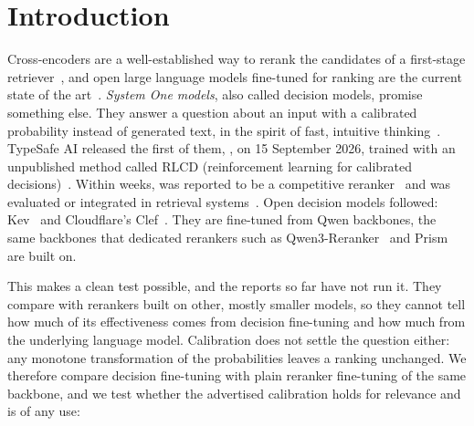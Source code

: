 \section{Introduction}
\label{sec:introduction}

Cross-encoders are a well-established way to rerank the candidates of a first-stage
retriever~\cite{Nogueira2019,Nogueira2020monoT5}, and open large language models fine-tuned for ranking are the
current state of the art~\cite{Ma2023RankLLaMA,Zhang2025Qwen3Embedding,Zhang2026Prism}. \emph{System One models},
also called decision models, promise something else. They answer a question about an input with a calibrated
probability instead of generated text, in the spirit of fast, intuitive thinking~\cite{Kahneman2011,TypeSafe2026Jev}.
TypeSafe AI released the first of them, \jev{}, on 15 September 2026, trained with an unpublished method called RLCD
(reinforcement learning for calibrated decisions)~\cite{TypeSafe2026Jev}. Within weeks, \jev{} was reported to be a
competitive reranker~\cite{S1Rank,JevRerank} and was evaluated or integrated in retrieval
systems~\cite{Elastic2026,LanceDB2026,Hindsight2026}. Open decision models followed: Kev~\cite{Kev} and Cloudflare's
Clef~\cite{Clef}. They are fine-tuned from Qwen backbones, the same backbones that dedicated rerankers such as
Qwen3-Reranker~\cite{Zhang2025Qwen3Embedding} and Prism~\cite{Zhang2026Prism} are built on.

This makes a clean test possible, and the reports so far have not run it. They compare \jev{} with rerankers built
on other, mostly smaller models, so they cannot tell how much of its effectiveness comes from decision fine-tuning
and how much from the underlying language model. Calibration does not settle the question either: any monotone
transformation of the probabilities leaves a ranking unchanged. We therefore compare decision fine-tuning with plain
reranker fine-tuning of the same backbone, and we test whether the advertised calibration holds for relevance and is
of any use:


